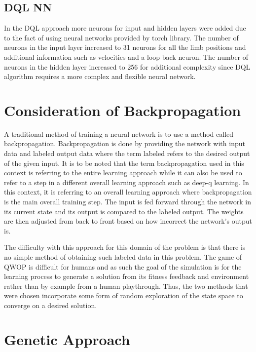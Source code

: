\documentclass[letterpaper]{article} %
\begin{document}
\subsection{DQL NN}
\par In the DQL approach more neurons for input and hidden layers were added due to the fact of using neural networks provided by torch library. The number of neurons in the input layer increased to 31 neurons for all the limb positions and additional information such as velocities and a loop-back neuron. The number of neurons in the hidden layer increased to 256 for additional complexity since DQL algorithm requires a more complex and flexible neural network.

\section{Consideration of Backpropagation}

A traditional method of training a neural network is to use a method called backpropagation. Backpropagation is done by providing the network with input data and labeled output data where the term labeled refers to the desired output of the given input. It is to be noted that the term backpropagation used in this context is referring to the entire learning approach while it can also be used to refer to a step in a different overall learning approach such as deep-q learning. In this context, it is referring to an overall learning approach where backpropagation is the main overall training step. The input is fed forward through the network in its current state and its output is compared to the labeled output. The weights are then adjusted from back to front based on how incorrect the network's output is. 

\par The difficulty with this approach for this domain of the problem is that there is no simple method of obtaining such labeled data in this problem. The game of QWOP is difficult for humans and as such the goal of the simulation is for the learning process to generate a solution from its fitness feedback and environment rather than by example from a human playthrough. Thus, the two methods that were chosen incorporate some form of random exploration of the state space to converge on a desired solution.

\section{Genetic Approach}
\end{document}
